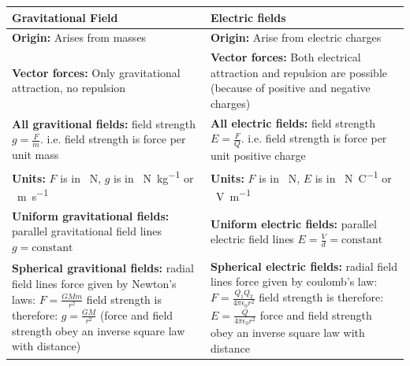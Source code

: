 \documentclass{scrbook}
\begin{document}
	\begin{tabular}{| p{0.5\linewidth} | p{0.5\linewidth} |}
		\hline
		Gravitational Field & Electric fields \\
		\hline \hline
		\textbf{Origin: } \newline Arises from masses & \textbf{Origin: } \newline Arise from electric charges \\ \hline
		\textbf{Vector forces: } \newline Only gravitational attraction, no repulsion & \textbf{Vector forces: } \newline Both electrical attraction and repulsion are possible (because of positive and negative charges) \\ \hline
		\textbf{All gravitional fields: } \newline field strength \newline $g = \frac{F}{m}$. \newline i.e. field strength is force per unit mass & \textbf{All electric fields: } \newline field strength \newline $E = \frac{F}{Q}$. \newline i.e. field strength is force per unit positive charge \\ \hline
		\textbf{Units: } \newline $F$ is in \SI{}{\newton}, $g$ is in \SI{}{\newton\per\kilo\gram} or \SI{}{\meter\per\second} & \textbf{Units: } \newline $F$ is in \SI{}{\newton}, $E$ is in \SI{}{\newton\per\coulomb} or \SI{}{\volt\per\meter} \\ \hline
		\textbf{Uniform gravitational fields: } \newline parallel gravitational field lines \newline $g = \text{constant}$ & \textbf{Uniform electric fields: } \newline parallel electric field lines \newline $E = \frac{V}{d} = \text{constant}$ \\ \hline
		\textbf{Spherical gravitional fields: } \newline radial field lines \newline force given by Newton's laws: $F = \frac{GMm}{r^2}$ \newline field strength is therefore: $g = \frac{GM}{r^2}$ \newline (force and field strength obey an inverse square law with distance) & \textbf{Spherical electric fields: } \newline radial field lines \newline force given by coulomb's law: $F = \frac{Q_1 Q_2}{4\pi \epsilon_0 r^2}$ \newline field strength is therefore: $E = \frac{Q}{4\pi \epsilon_0 r^2}$ \newline force and field strength obey an inverse square law with distance \\ \hline

\end{tabular}
\end{document}
